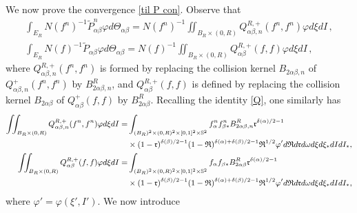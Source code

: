 \documentclass[reqno,11pt]{amsart}
\numberwithin{equation}{section}
\begin{document}
We now prove the convergence \eqref{til P con}. Observe that
  \begin{align*}
    \int_{E_R} N (f^n)^{-1} \tilde{P}^n_{\alpha \beta}\varphi d \Theta_{\alpha \beta} = N (f^n)^{-1}\iint_{B_R \times (0,R)} Q^{R, +}_{ \alpha \beta, n}(f^n,f^n)\varphi d\xi dI \,, \\
    \int_{E_R} N (f)^{-1} \tilde{P}_{\alpha \beta}\varphi d \Theta_{\alpha \beta} = N (f)^{-1} \iint_{B_R \times (0,R)} Q^{R, +}_{ \alpha \beta}(f,f)\varphi d\xi dI \,,
  \end{align*}
where $Q^{R, +}_{ \alpha \beta, n}(f^n,f^n)$ is formed by replacing the collision kernel $B_{2 \alpha \beta, n}$ of $Q^+_{\alpha \beta, n} (f^n, f^n)$ by $B_{2 \alpha \beta, n}^R$, and $ Q^{R, +}_{ \alpha \beta}(f,f) $ is defined by replacing the collision kernel $B_{2 \alpha \beta}$ of $Q^+_{\alpha \beta } (f, f)$ by $B_{2 \alpha \beta}^R$. Recalling the identity \eqref{Q}, one similarly has
\begin{equation*}{\small
\begin{aligned}
\iint_{B_R \times (0,R)} Q^{R, +}_{ \alpha \beta, n }(f^n,f^n)\varphi d\xi dI
=&   \int_{(B_R)^2 \times (0,R)^2 \times [0,1]^2 \times \mathbb{S}^2} f^n_\alpha f^n_{\beta *} B^R_{2\alpha \beta, n}  \mathfrak{r}^{\delta (\alpha)/2-1} \\
&\times (1- \mathfrak{r})^{\delta(\beta)/2-1} (1-\mathfrak{R})^{\delta(\alpha)+\delta(\beta)/2-1} \mathfrak{R}^{1/2}\varphi' d \mathfrak{R} d \mathfrak{r} d\omega d\xi d\xi_* dI dI_*, \\
\iint_{B_R \times (0,R)} Q^{R, +}_{ \alpha \beta} (f,f)\varphi d\xi dI
=& \int_{(B_R)^2 \times (0,R)^2 \times [0,1]^2 \times \mathbb{S}^2} f_\alpha f_{\beta *} B^R_{2\alpha \beta} \mathfrak{r}^{\delta (\alpha)/2-1} \\
&\times (1- \mathfrak{r})^{\delta(\beta)/2-1} (1-\mathfrak{R})^{\delta(\alpha)+\delta(\beta)/2-1} \mathfrak{R}^{1/2}\varphi' d \mathfrak{R} d \mathfrak{r} d\omega d\xi d\xi_* dI dI_*,
\end{aligned}}
\end{equation*}
where $\varphi'=\varphi (\xi',I')$. We now introduce
\end{document}
